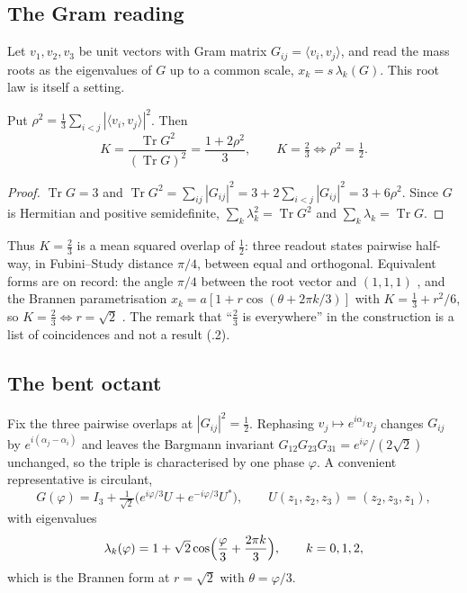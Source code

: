 \subsection{The Gram reading}
\label{sec:B-gram}

Let $v_1,v_2,v_3$ be unit vectors with Gram matrix $G_{ij}=\langle v_i,v_j\rangle$, and read the mass roots as the eigenvalues
of $G$ up to a common scale, $x_k=s\,\lambda_k(G)$. This root law is itself a setting.

\begin{proposition}[\rnd{r12}.2]\label{prop:B-gram}
Put $\rho^2=\tfrac13\sum_{i<j}|\langle v_i,v_j\rangle|^2$. Then
\begin{equation}
 K=\frac{\operatorname{Tr}G^2}{(\operatorname{Tr}G)^2}=\frac{1+2\rho^2}{3},\qquad
 K=\tfrac23\iff\rho^2=\tfrac12 .
 \label{eq:B-K-rho}
\end{equation}
\end{proposition}

\begin{proof}
$\operatorname{Tr}G=3$ and $\operatorname{Tr}G^2=\sum_{ij}|G_{ij}|^2=3+2\sum_{i<j}|G_{ij}|^2=3+6\rho^2$. Since $G$ is Hermitian
and positive semidefinite, $\sum_k\lambda_k^2=\operatorname{Tr}G^2$ and $\sum_k\lambda_k=\operatorname{Tr}G$.
\end{proof}

Thus $K=\tfrac23$ is a mean squared overlap of $\tfrac12$: three readout states pairwise half-way, in Fubini--Study distance
$\pi/4$, between equal and orthogonal. Equivalent forms are on record: the angle $\pi/4$ between the root vector and
$(1,1,1)$ \cite{Foot1994}, and the Brannen parametrisation $x_k=a[1+r\cos(\theta+2\pi k/3)]$ with $K=\tfrac13+r^2/6$, so
$K=\tfrac23\iff r=\sqrt2$ \cite{Brannen2010}. The remark that ``$\tfrac23$ is everywhere'' in the construction is a list
of coincidences and not a result (.2).

\subsection{The bent octant}
\label{sec:B-bent}

Fix the three pairwise overlaps at $|G_{ij}|^2=\tfrac12$. Rephasing $v_j\mapsto e^{i\alpha_j}v_j$ changes $G_{ij}$ by
$e^{i(\alpha_j-\alpha_i)}$ and leaves the Bargmann invariant $G_{12}G_{23}G_{31}=e^{i\varphi}/(2\sqrt2)$ unchanged, so the
triple is characterised by one phase $\varphi$. A convenient representative is circulant,
\begin{equation}
 G(\varphi)=I_3+\tfrac1{\sqrt2}\bigl(e^{i\varphi/3}U+e^{-i\varphi/3}U^*\bigr),\qquad U(z_1,z_2,z_3)=(z_2,z_3,z_1),
 \label{eq:B-circulant}
\end{equation}
with eigenvalues
\begin{equation}
 \lambda_k(\varphi)=1+\sqrt2\cos\Bigl(\frac{\varphi}{3}+\frac{2\pi k}{3}\Bigr),\qquad k=0,1,2,
 \label{eq:B-roots}
\end{equation}
which is the Brannen form at $r=\sqrt2$ with $\theta=\varphi/3$.

